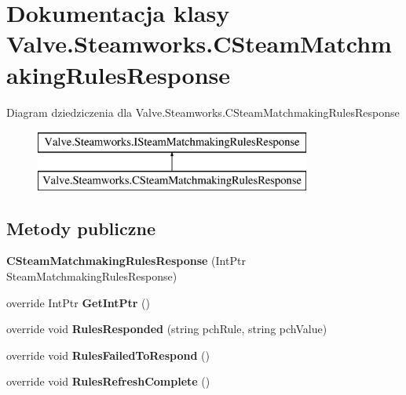 \hypertarget{class_valve_1_1_steamworks_1_1_c_steam_matchmaking_rules_response}{}\section{Dokumentacja klasy Valve.\+Steamworks.\+C\+Steam\+Matchmaking\+Rules\+Response}
\label{class_valve_1_1_steamworks_1_1_c_steam_matchmaking_rules_response}
Diagram dziedziczenia dla Valve.\+Steamworks.\+C\+Steam\+Matchmaking\+Rules\+Response\begin{figure}[H]
\begin{center}
\leavevmode
\includegraphics[height=2.000000cm]{class_valve_1_1_steamworks_1_1_c_steam_matchmaking_rules_response}
\end{center}
\end{figure}
\subsection*{Metody publiczne}
\begin{DoxyCompactItemize}
\item 
\mbox{\label{class_valve_1_1_steamworks_1_1_c_steam_matchmaking_rules_response_ad5876b16e99e501e32f796babdb3693d}} 
{\bfseries C\+Steam\+Matchmaking\+Rules\+Response} (Int\+Ptr Steam\+Matchmaking\+Rules\+Response)
\item 
\mbox{\label{class_valve_1_1_steamworks_1_1_c_steam_matchmaking_rules_response_a84d95ba9cbd3a9f2ecad35c6f7577706}} 
override Int\+Ptr {\bfseries Get\+Int\+Ptr} ()
\item 
\mbox{\label{class_valve_1_1_steamworks_1_1_c_steam_matchmaking_rules_response_a806baba8409d76e4c45d60acf83f9e78}} 
override void {\bfseries Rules\+Responded} (string pch\+Rule, string pch\+Value)
\item 
\mbox{\label{class_valve_1_1_steamworks_1_1_c_steam_matchmaking_rules_response_a0e0e4599c2a1769b048b6ee9a3ee9182}} 
override void {\bfseries Rules\+Failed\+To\+Respond} ()
\item 
\mbox{\label{class_valve_1_1_steamworks_1_1_c_steam_matchmaking_rules_response_a20e89c4b25490658b7925b20dad8fb4c}} 
override void {\bfseries Rules\+Refresh\+Complete} ()
\end{DoxyCompactItemize}



